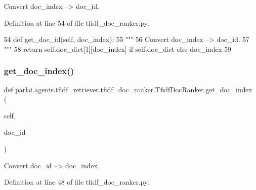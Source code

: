\begin{DoxyVerb}Convert doc_index --> doc_id.
\end{DoxyVerb}
 

Definition at line 54 of file tfidf\+\_\+doc\+\_\+ranker.\+py.


\begin{DoxyCode}
54     \textcolor{keyword}{def }get\_doc\_id(self, doc\_index):
55         \textcolor{stringliteral}{"""}
56 \textcolor{stringliteral}{        Convert doc\_index --> doc\_id.}
57 \textcolor{stringliteral}{        """}
58         \textcolor{keywordflow}{return} self.doc\_dict[1][doc\_index] \textcolor{keywordflow}{if} self.doc\_dict \textcolor{keywordflow}{else} doc\_index
59 
\end{DoxyCode}
\mbox{\label{classparlai_1_1agents_1_1tfidf__retriever_1_1tfidf__doc__ranker_1_1TfidfDocRanker_a4992c638010961247510dcb2ab96bd8e}} 
\subsubsection{\texorpdfstring{get\+\_\+doc\+\_\+index()}{get\_doc\_index()}}
{\footnotesize\ttfamily def parlai.\+agents.\+tfidf\+\_\+retriever.\+tfidf\+\_\+doc\+\_\+ranker.\+Tfidf\+Doc\+Ranker.\+get\+\_\+doc\+\_\+index (\begin{DoxyParamCaption}\item[{}]{self,  }\item[{}]{doc\+\_\+id }\end{DoxyParamCaption})}

\begin{DoxyVerb}Convert doc_id --> doc_index.
\end{DoxyVerb}
 

Definition at line 48 of file tfidf\+\_\+doc\+\_\+ranker.\+py.



